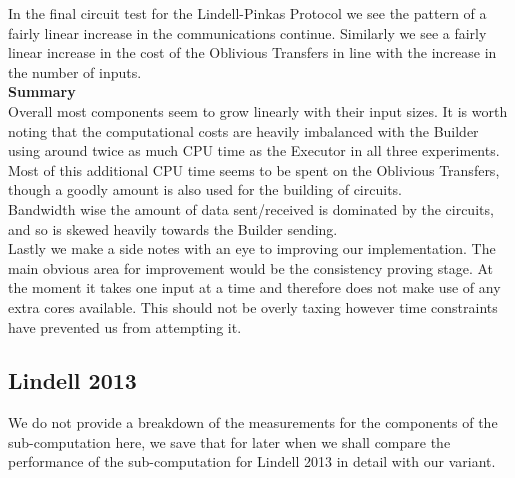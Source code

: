 \documentclass[ %
                    author={Nicholas Tutte},
                supervisor={Prof. Nigel Smart},
                    degree={MEng},
                     title={Secure Two Party Computation},
                  subtitle={A practical comparison of recent protocols},
                      type={Research - GG1K},
                      year={2015} ]{dissertation}
\begin{document}
				In the final circuit test for the Lindell-Pinkas Protocol we see the pattern of a fairly linear increase in the communications continue. Similarly we see a fairly linear increase in the cost of the Oblivious Transfers in line with the increase in the number of inputs.\\

			\noindent\textbf{Summary}\\

				Overall most components seem to grow linearly with their input sizes. It is worth noting that the computational costs are heavily imbalanced with the Builder  using around twice as much CPU time as the Executor in all three experiments. Most of this additional CPU time seems to be spent on the Oblivious Transfers, though a goodly amount is also used for the building of circuits.\\

				Bandwidth wise the amount of data sent/received is dominated by the circuits, and so is skewed heavily towards the Builder sending.\\

				Lastly we make a side notes with an eye to improving our implementation. The main obvious area for improvement would be the consistency proving stage. At the moment it takes one input at a time and therefore does not make use of any extra cores available. This should not be overly taxing however time constraints have prevented us from attempting it.

			\subsection{Lindell 2013}
				We do not provide a breakdown of the measurements for the components of the sub-computation here, we save that for later when we shall compare the performance of the sub-computation for Lindell 2013 in detail with our variant.\\
\end{document}

